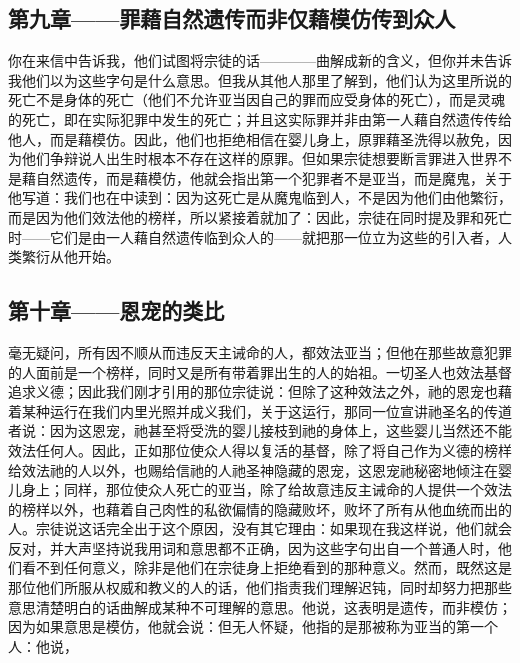 \subsection{第九章——罪藉自然遗传而非仅藉模仿传到众人}

你在来信中告诉我，他们试图将宗徒的话————曲解成新的含义，但你并未告诉我他们以为这些字句是什么意思。但我从其他人那里了解到，他们认为这里所说的死亡不是身体的死亡（他们不允许亚当因自己的罪而应受身体的死亡），而是灵魂的死亡，即在实际犯罪中发生的死亡；并且这实际罪并非由第一人藉自然遗传传给他人，而是藉模仿。因此，他们也拒绝相信在婴儿身上，原罪藉圣洗得以赦免，因为他们争辩说人出生时根本不存在这样的原罪。但如果宗徒想要断言罪进入世界不是藉自然遗传，而是藉模仿，他就会指出第一个犯罪者不是亚当，而是魔鬼，关于他写道：我们也在中读到：因为这死亡是从魔鬼临到人，不是因为他们由他繁衍，而是因为他们效法他的榜样，所以紧接着就加了：因此，宗徒在同时提及罪和死亡时——它们是由一人藉自然遗传临到众人的——就把那一位立为这些的引入者，人类繁衍从他开始。\par


\subsection{第十章——恩宠的类比}

毫无疑问，所有因不顺从而违反天主诫命的人，都效法亚当；但他在那些故意犯罪的人面前是一个榜样，同时又是所有带着罪出生的人的始祖。一切圣人也效法基督追求义德；因此我们刚才引用的那位宗徒说：但除了这种效法之外，祂的恩宠也藉着某种运行在我们内里光照并成义我们，关于这运行，那同一位宣讲祂圣名的传道者说：因为这恩宠，祂甚至将受洗的婴儿接枝到祂的身体上，这些婴儿当然还不能效法任何人。因此，正如那位使众人得以复活的基督，除了将自己作为义德的榜样给效法祂的人以外，也赐给信祂的人祂圣神隐藏的恩宠，这恩宠祂秘密地倾注在婴儿身上；同样，那位使众人死亡的亚当，除了给故意违反主诫命的人提供一个效法的榜样以外，也藉着自己肉性的私欲偏情的隐藏败坏，败坏了所有从他血统而出的人。宗徒说这话完全出于这个原因，没有其它理由：如果现在我这样说，他们就会反对，并大声坚持说我用词和意思都不正确，因为这些字句出自一个普通人时，他们看不到任何意义，除非是他们在宗徒身上拒绝看到的那种意义。然而，既然这是那位他们所服从权威和教义的人的话，他们指责我们理解迟钝，同时却努力把那些意思清楚明白的话曲解成某种不可理解的意思。他说，这表明是遗传，而非模仿；因为如果意思是模仿，他就会说：但无人怀疑，他指的是那被称为亚当的第一个人：他说，\par

